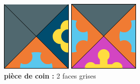 	\begin{figure}[H]
	   	\includegraphics[width=\linewidth]{images/piece_coin.png}
	   	\caption{\textbf{pièce de coin :} 2 faces grises}\label{fig:piece_coin}
	   	\endminipage\hfill
	   	\includegraphics[width=\linewidth]{images/piece_bord.png}

\end{figure}
